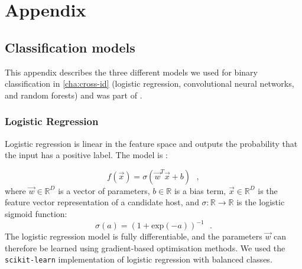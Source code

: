 
\appendix

\chapter*{Appendix}

\renewcommand{\thefigure}{\Alph{section}.\arabic{figure}}
\renewcommand{\thetable}{\Alph{section}.\arabic{table}}
\renewcommand{\theequation}{\Alph{section}.\arabic{equation}}

\section{Classification models}\label{sec:atlas-xid-models}

  This appendix describes the three different models we used for binary classification in \autoref{cha:cross-id} (logistic
  regression, convolutional neural networks, and random forests) and was part of \citet{alger18radio}.

  \subsection{Logistic Regression}
  \label{sec:atlas-logistic-regression}
    Logistic regression is linear in the feature space and outputs the
    probability that the input has a positive label. The model is
    \citep{bishop06ml}:

    \begin{equation}
        f(\vec x) = \sigma(\vec w^T \vec x + b) \,\,\,\,,
    \end{equation}
    where $\vec w \in \mathbb{R}^D$ is a vector of parameters, $b \in \mathbb{R}$ is a bias term, $\vec x \in \mathbb{R}^D$ is the feature vector representation of a candidate host, and $\sigma : \mathbb{R} \to \mathbb{R}$ is the logistic sigmoid function: \begin{equation}
        \sigma(a) = (1 + \mathrm{exp}(-a))^{-1}\,\,\,\,.
    \end{equation}%
    The logistic regression model is fully differentiable, and the parameters
    $\vec w$ can therefore be learned using gradient-based optimisation
    methods. {We used the \texttt{scikit-learn} \citep{pedregosa11sklearn}
    implementation of logistic regression with balanced classes}.

